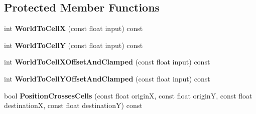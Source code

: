 \subsection*{Protected Member Functions}
\begin{DoxyCompactItemize}
\item 
\hypertarget{class_grid_sectorizer_aa5135fabe508907bda5db482de569d5c}{int {\bfseries World\-To\-Cell\-X} (const float input) const }\label{class_grid_sectorizer_aa5135fabe508907bda5db482de569d5c}

\item 
\hypertarget{class_grid_sectorizer_a86870bedd61138c0883e7bbba67067d6}{int {\bfseries World\-To\-Cell\-Y} (const float input) const }\label{class_grid_sectorizer_a86870bedd61138c0883e7bbba67067d6}

\item 
\hypertarget{class_grid_sectorizer_af16c1203d737a0a6727d0b018e8b0e93}{int {\bfseries World\-To\-Cell\-X\-Offset\-And\-Clamped} (const float input) const }\label{class_grid_sectorizer_af16c1203d737a0a6727d0b018e8b0e93}

\item 
\hypertarget{class_grid_sectorizer_a289878a66aca5e02080fdc75a004e540}{int {\bfseries World\-To\-Cell\-Y\-Offset\-And\-Clamped} (const float input) const }\label{class_grid_sectorizer_a289878a66aca5e02080fdc75a004e540}

\item 
\hypertarget{class_grid_sectorizer_ae47d2bd996d1ea00fbd1fe942823ab2b}{bool {\bfseries Position\-Crosses\-Cells} (const float origin\-X, const float origin\-Y, const float destination\-X, const float destination\-Y) const }\label{class_grid_sectorizer_ae47d2bd996d1ea00fbd1fe942823ab2b}

\end{DoxyCompactItemize}
